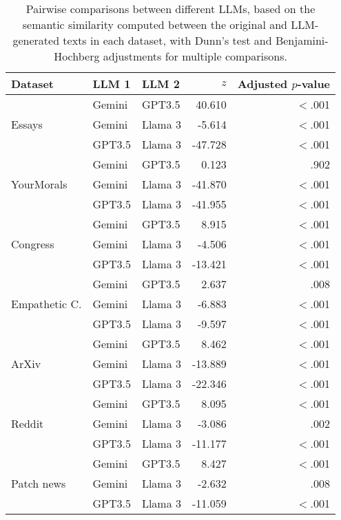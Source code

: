 \begin{table*}[ht]
\caption{Pairwise comparisons between different LLMs, based on the semantic similarity computed between the original and LLM-generated texts in each dataset, with Dunn's test and Benjamini-Hochberg adjustments for multiple comparisons.}
\centering
\begin{tabular}{lllrr}
\toprule
Dataset & LLM 1 & LLM 2 & $z$ & Adjusted $p$-value \\\hline
 & Gemini & GPT3.5 & 40.610 & $<$.001\\
Essays & Gemini & Llama 3 & -5.614 & $<$.001\\
 & GPT3.5 & Llama 3 & -47.728 & $<$.001\\
\hline
 & Gemini & GPT3.5 & 0.123 & .902 \\
YourMorals & Gemini & Llama 3 & -41.870 & $<$.001\\
 & GPT3.5 & Llama 3 & -41.955 & $<$.001\\
\hline
 & Gemini & GPT3.5 & 8.915 & $<$.001\\
Congress & Gemini & Llama 3 & -4.506 & $<$.001\\
 & GPT3.5 & Llama 3 & -13.421 & $<$.001\\
\hline
 & Gemini & GPT3.5 & 2.637 & .008 \\
Empathetic C. & Gemini & Llama 3 & -6.883 & $<$.001\\
& GPT3.5 & Llama 3 & -9.597 & $<$.001\\
\hline
& Gemini & GPT3.5 & 8.462 & $<$.001 \\
ArXiv & Gemini & Llama 3 & -13.889 & $<$.001\\
& GPT3.5 & Llama 3 & -22.346 & $<$.001\\
\hline
& Gemini & GPT3.5 & 8.095 & $<$.001 \\
Reddit & Gemini & Llama 3 & -3.086 & .002\\
& GPT3.5 & Llama 3 & -11.177 & $<$.001\\
\hline
& Gemini & GPT3.5 & 8.427 & $<$.001 \\
Patch news & Gemini & Llama 3 & -2.632 & .008\\
& GPT3.5 & Llama 3 & -11.059 & $<$.001\\
\bottomrule
\end{tabular}
\label{tab:pairwise_sim}
\end{table*}
